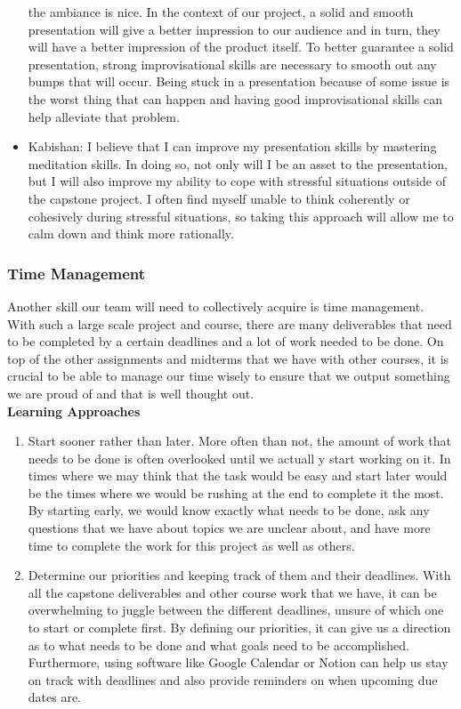 \documentclass[12pt,letterpaper]{article}
\begin{document}
\begin{itemize}
    the ambiance is nice. In the context of our project, a solid and smooth
    presentation will give a better impression to our audience and in turn, they
    will have a better impression of the product itself. To better guarantee a
    solid presentation, strong improvisational skills are necessary to smooth
    out any bumps that will occur. Being stuck in a presentation because of some
    issue is the worst thing that can happen and having good improvisational
    skills can help alleviate that problem.
    \item Kabishan: I believe that I can improve my presentation skills by
    mastering meditation skills. In doing so, not only will I be an asset to the
    presentation, but I will also improve my ability to cope with stressful
    situations outside of the capstone project. I often find myself unable to
    think coherently or cohesively during stressful situations, so taking this
    approach will allow me to calm down and think more rationally.
\end{itemize}

\subsubsection{Time Management}
Another skill our team will need to collectively acquire is time management.
With such a large scale project and course, there are many deliverables that
need to be completed by a certain deadlines and a lot of work needed to be done.
On top of the other assignments and midterms that we have with other courses, it
is crucial to be able to manage our time wisely to ensure that we output
something we are proud of and that is well thought out. \\[.1in]
\noindent \textbf{Learning Approaches}
\begin{enumerate}
    \item Start sooner rather than later. More often than not, the amount of
    work that needs to be done is often overlooked until we actuall y start
    working on it. In times where we may think that the task would be easy and
    start later would be the times where we would be rushing at the end to
    complete it the most. By starting early, we would know exactly what needs to
    be done, ask any questions that we have about topics we are unclear about,
    and have more time to complete the work for this project as well as others. 
    \item Determine our priorities and keeping track of them and their
    deadlines. With all the capstone deliverables and other course work that we
    have, it can be overwhelming to juggle between the different deadlines,
    unsure of which one to start or complete first. By defining our priorities,
    it can give us a direction as to what needs to be done and what goals need
    to be accomplished. Furthermore, using software like Google Calendar or
    Notion can help us stay on track with deadlines and also provide reminders
    on when upcoming due dates are.
\end{enumerate}
\end{document}
